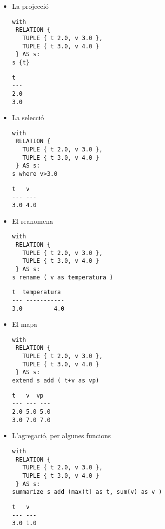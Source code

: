\begin{itemize}
\item La projecció
\begin{lstlisting}[style=tutorialD]
with
 RELATION {
   TUPLE { t 2.0, v 3.0 },
   TUPLE { t 3.0, v 4.0 }
 } AS s:
s {t}
\end{lstlisting}
\begin{lstlisting}[style=stdout]
 t
---
2.0
3.0
\end{lstlisting}

\item La selecció
\begin{lstlisting}[style=tutorialD]
with
 RELATION {
   TUPLE { t 2.0, v 3.0 },
   TUPLE { t 3.0, v 4.0 }
 } AS s:
s where v>3.0
\end{lstlisting}
\begin{lstlisting}[style=stdout]
 t   v 
--- ---
3.0 4.0
\end{lstlisting}


\item El reanomena
\begin{lstlisting}[style=tutorialD]
with
 RELATION {
   TUPLE { t 2.0, v 3.0 },
   TUPLE { t 3.0, v 4.0 }
 } AS s:
s rename ( v as temperatura )
\end{lstlisting}
\begin{lstlisting}[style=stdout]
 t  temperatura 
--- -----------
3.0         4.0
\end{lstlisting}


\item El mapa 
\begin{lstlisting}[style=tutorialD]
with
 RELATION {
   TUPLE { t 2.0, v 3.0 },
   TUPLE { t 3.0, v 4.0 }
 } AS s:
extend s add ( t+v as vp) 
\end{lstlisting}
\begin{lstlisting}[style=stdout]
 t   v  vp
--- --- ---
2.0 5.0 5.0
3.0 7.0 7.0
\end{lstlisting}


\item L'agregació, per algunes funcions
\begin{lstlisting}[style=tutorialD]
with
 RELATION {
   TUPLE { t 2.0, v 3.0 },
   TUPLE { t 3.0, v 4.0 }
 } AS s:
summarize s add (max(t) as t, sum(v) as v )
\end{lstlisting}
\begin{lstlisting}[style=stdout]
 t   v  
--- ---
3.0 1.0
\end{lstlisting}


\end{itemize}





